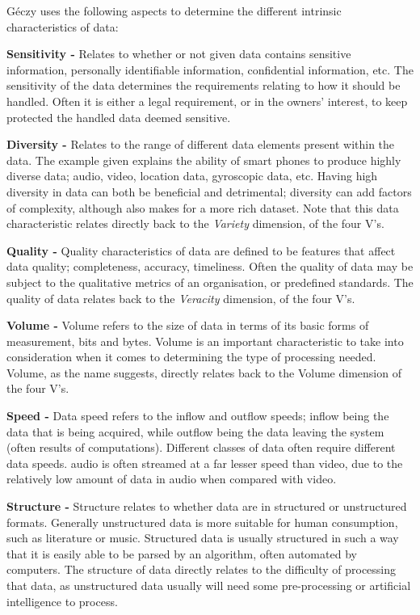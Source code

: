 \documentclass[a4paper,11pt]{article}
\begin{document}
\noindent G\'eczy uses the following aspects to determine the different intrinsic characteristics of data:

\noindent \textbf{Sensitivity -} Relates to whether or not given data contains sensitive information, \ie{}personally
identifiable information, confidential information, etc. The sensitivity of the data determines the requirements relating
to how it should be handled. Often it is either a legal requirement, or in the owners' interest, to keep protected the
handled data deemed sensitive.

\noindent \textbf{Diversity -} Relates to the range of different data elements present within the data. The example given
explains the ability of smart phones to produce highly diverse data; \eg{}audio, video, location data, gyroscopic data,
etc. Having high diversity in data can both be beneficial and detrimental; diversity can add factors of complexity,
although also makes for a more rich dataset. Note that this data characteristic relates directly back to the
\emph{Variety} dimension, of the four V's.

\noindent \textbf{Quality -} Quality characteristics of data are defined to be features that affect data quality;
\eg{}completeness, accuracy, timeliness. Often the quality of data may be subject to the qualitative metrics of an
organisation, or predefined standards. The quality of data relates back to the \emph{Veracity} dimension, of the four
V's.

\noindent \textbf{Volume -} Volume refers to the size of data in terms of its basic forms of measurement, bits and bytes.
Volume is an important characteristic to take into consideration when it comes to determining the type of processing
needed. Volume, as the name suggests, directly relates back to the Volume dimension of the four V's.

\noindent \textbf{Speed -} Data speed refers to the inflow and outflow speeds; inflow being the data that is being
acquired, while outflow being the data leaving the system (often results of computations). Different classes of data
often require different data speeds. \eg{}audio is often streamed at a far lesser speed than video, due to the
relatively low amount of data in audio when compared with video.

\noindent \textbf{Structure -} Structure relates to whether data are in structured or unstructured formats. Generally
unstructured data is more suitable for human consumption, such as literature or music. Structured data is usually
structured in such a way that it is easily able to be parsed by an algorithm, often automated by computers. The
structure of data directly relates to the difficulty of processing that data, as unstructured data usually will need
some pre-processing or artificial intelligence to process.
\end{document}
